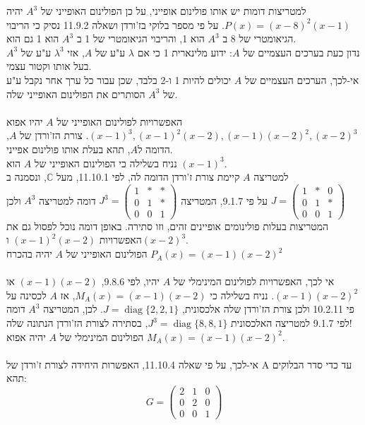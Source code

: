 \documentclass{article}
\def\complex{\mathbb{C}}
\DeclareMathOperator{\diag}{diag}
\begin{document}
למטריצות דומות יש אותו פולינום אופייני, על כן הפולינום האופייני של $A^3$ יהיה $P(x)=(x-8)^2(x-1)$.
על פי מספר בלוקי בז'ורדן ושאלה 11.9.2 נסיק כי הריבוי הגיאומטרי של 8 ב $A^3$ הוא 1, והריבוי הגיאומטרי של 1 ב $A^3$ הוא 1 גם הוא. \\
נדון כעת בערכים העצמיים של $A$: ידוע מלינארית 1 כי אם $\lambda$ ע"ע של $A$, אזי $\lambda^3$ ע"ע של $A^3$ בעל אותו וקטור עצמי. \\
אי-לכך, הערכים העצמיים של $A$ יכולים להיות 1 ו-2 בלבד, שכן עבור כל ערך אחר נקבל ע"ע של $A^3$ הסותרים את הפולינום האופייני שלה.\\\\
האפשרויות לפולינום האופייני של $A$ יהיו אפוא $(x-1)^3, (x-1)^2(x-2), (x-1)(x-2)^2, (x-2)^3$. צורת הז'ורדן של $A$, הדומה ל$A$, תהא בעלת אותו פולינום אפייני.\\
נניח בשלילה כי הפולינום האופייני של $A$ הוא $(x-1)^3$. \\
למטריצה $A$ קיימת צורת ז'ורדן הדומה לה, לפי 11.10.1, מעל $\complex$, ונסמנה ב $J=\begin{pmatrix}
        1 & \ast & 0    \\
        0 & 1    & \ast \\
        0 & 0    & 1
    \end{pmatrix}$
על פי 9.1.7, המטריצה $J^3=\begin{pmatrix}
        1 & \ast & \ast \\
        0 & 1    & \ast \\
        0 & 0    & 1
    \end{pmatrix}$ דומה למטריצה $A^3$ ולכן המטריצות בעלות פולינומים אופיינים זהים, וזו סתירה.
באופן דומה נוכל לפסול גם את האפשרויות $(x-1)^2(x-2)$ ו$(x-2)^3$.\\
הפולינום האופייני של $A$ יהיה בהכרח $P_A(x)=(x-1)(x-2)^2$\\\\
אי לכך, האפשרויות לפולינום המינימלי של $A$ יהיו, לפי 9.8.6, $(x-1)(x-2)$ או $(x-1)(x-2)^2$. נניח בשלילה כי $M_A(x)=(x-1)(x-2)$, אז $A$ לכסינה על פי 10.2.11 ולכן צורת הז'ורדן שלה אלכסונית, $J=\diag\{2,2,1\}$.
לכן, המטריצה $A^3$ דומה לפי 9.1.7 למטריצה האלכסונית $J^3=\diag\{ 8,8,1 \}$, בסתירה לצורת הז'ורדן הנתונה שלה! \\
הפולינום המינימלי של $A$ יהיה אפוא $M_A(x)=(x-1)(x-2)^2$. \\\\
אי-לכך, על פי שאלה 11.10.4, האפשרות היחידה לצורת ז'ורדן של A עד כדי סדר הבלוקים תהא:
\[
    G=\begin{pmatrix}
        2 & 1 & 0 \\
        0 & 2 & 0 \\
        0 & 0 & 1
    \end{pmatrix}
\]
\end{document}
